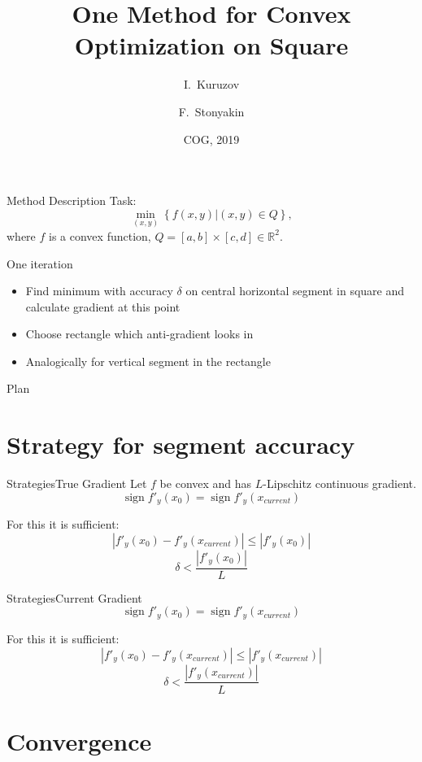 \documentclass{beamer}
\title{One Method for Convex Optimization on Square}
\author{I.~Kuruzov\inst{1} \and F.~Stonyakin\inst{1, 2}}
\institute[MIPT] %
{
  \inst{1}%
Moscow Institute of Physics and Technology
  \and
  \inst{2}%
V.I.Vernadsky Crimean Federal University}
\date{COG, 2019}
\DeclareMathOperator{\sign}{sign}
\begin{document}
\begin{frame}
  \titlepage
\end{frame}


\begin{frame}{Method Description}
Task:
$$\min_{(x,y)}\left\{f(x,y)|(x,y) \in Q\right\},$$
where $f$ is a convex function, $Q = [a,b]\times[c, d]\in \mathbb{R}^2$.

\begin{block}{One iteration}
\begin{itemize}
\item{Find minimum with accuracy $\delta$ on central horizontal segment in square and calculate gradient at this point\pause}
\item{Choose rectangle which anti-gradient looks in\pause}
\item{Analogically for vertical segment in the rectangle}
\end{itemize}
\end{block}
\end{frame}

\begin{frame}{Plan}
  \tableofcontents
\end{frame}


\section{Strategy for segment accuracy}


\begin{frame}{Strategies}{True Gradient}
Let $f$ be convex and has $L$-Lipschitz continuous gradient.
    $$\sign f'_y(x_0) = \sign f'_y(x_{current})$$
    
For this it is sufficient:
    $$|f'_y(x_0) - f'_y(x_{current})| \leq |f'_y(x_0)|$$
	\pause
  $$\boxed{\delta < \frac{|f'_y(x_{0})|}{L}}$$
\end{frame}

\begin{frame}{Strategies}{Current Gradient}
    $$\sign f'_y(x_0) = \sign f'_y(x_{current})$$
    
For this it is sufficient:
    $$|f'_y(x_0) - f'_y(x_{current})| \leq |f'_y(x_{current})|$$
	\pause
  $$\boxed{\delta < \frac{|f'_y(x_{current})|}{L}}$$
\end{frame}

\section{Convergence}
\end{document}
